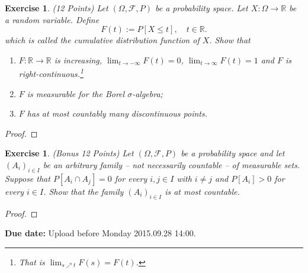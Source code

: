 \documentclass[DIV=classic,a4paper,10pt]{scrartcl}
\newtheorem{exercise}[theorem]{Exercise}
\theoremstyle{nonumberplain}
\newtheorem{proof}{Proof}
\numberwithin{equation}{section}
\begin{document}
\begin{exercise} (12 Points) \newline
    Let $(\Omega,\mathcal{F},P)$ be a probability space.
    Let $X:\Omega \to \mathbb{R}$ be a random variable.
    Define
    \begin{equation*}
        F(t):=P[X\leq t], \quad t \in \mathbb{R}.
    \end{equation*}
    which is called the \emph{cumulative distribution function of }$X$.
    Show that
    \begin{enumerate}[label=\arabic*)]
        \item $F:\mathbb{R}\to \mathbb{R}$ is increasing, $\lim_{t \to -\infty}F(t)=0$, $\lim_{t \to \infty}F(t)=1$ and $F$ is right-continuous.\footnote{That is $\lim_{s\nearrow t}F(s)=F(t)$.}
        \item $F$ is measurable for the Borel $\sigma$-algebra;
        \item $F$ has at most countably many discontinuous points.
    \end{enumerate}
\end{exercise}
\begin{proof}
    
\end{proof}

\begin{exercise} (Bonus 12 Points) \newline
    Let $(\Omega,\mathcal{F},P)$ be a probability space and let $(A_i)_{i\in I}$ be an arbitrary family -- not necessarily countable -- of measurable sets.
    Suppose that $P[A_i\cap A_j]=0$ for every $i,j\in I$ with $i\neq j$ and $P[A_i]>0$ for every $i\in I$.
    Show that the family $(A_i)_{i\in I}$ is at most countable.
\end{exercise}
\begin{proof}
    
\end{proof}
\smallskip
\noindent
\textbf{Due date:} Upload before Monday 2015.09.28 14:00.
\end{document}
